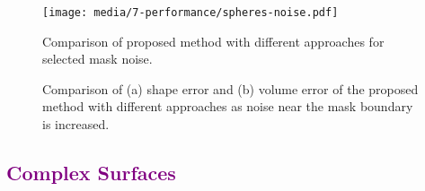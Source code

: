 \color{purple}
\begin{figure}[ht!]
	\centering
	\texttt{[image: media/7-performance/spheres-noise.pdf]}
	\caption{Comparison of proposed method with different approaches for selected mask noise.}
	\label{fig:demos3}
\end{figure}
\begin{figure}[h!]
	\centering
	\caption{Comparison of (a) shape error and (b) volume error of the proposed method with different approaches as noise near the mask boundary is increased.}
	\label{fig:graph4}
\end{figure}

\color{black}
\subsection{\textcolor{purple}{Complex Surfaces}}
\label{Complex Surfaces}

